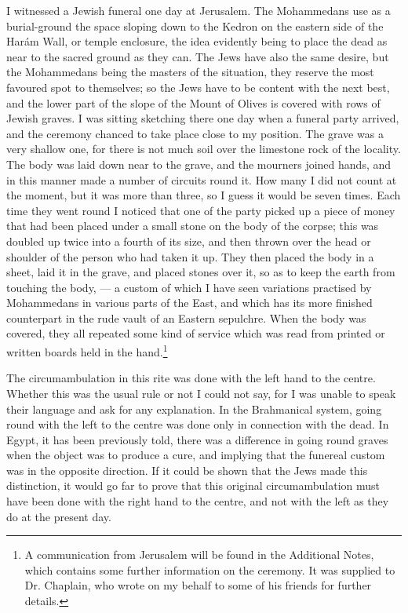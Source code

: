 \documentclass[a4paper, 11pt, oneside, polutonikogreek, english]{article}
\begin{document}
I witnessed a Jewish funeral one day at Jerusalem. The Mohammedans use as a burial-ground the space sloping down to the Kedron on the eastern side of the Harám Wall, or temple enclosure, the idea evidently being to place the dead as near to the sacred ground as they can. The Jews have also the same desire, but the Mohammedans being the masters of the situation, they reserve the most favoured spot to themselves; so the Jews have to be content with the next best, and the lower part of the slope of the Mount of Olives is covered with rows of Jewish graves. I was sitting sketching there one day when a funeral party arrived, and the ceremony chanced to take place close to my position. The grave was a very shallow one, for there is not much soil over the limestone rock of the locality. The body was laid down near to the grave, and the mourners joined hands, and in this manner made a number of circuits round it. How many I did not count at the moment, but it was more than three, so I guess it would be seven times. Each time they went round I noticed that one of the party picked up a piece of money that had been placed under a small stone on the body of the corpse; this was doubled up twice into a fourth of its size, and then thrown over the head or shoulder of the person who had taken it up. They then placed the body in a sheet, laid it in the grave, and placed stones over it, so as to keep the earth from touching the body, --- a custom of which I have seen variations practised by Mohammedans in various parts of the East, and which has its more finished counterpart in the rude vault of an Eastern sepulchre. When the body was covered, they all repeated some kind of service which was read from printed or written boards held in the hand.\footnote{A communication from Jerusalem will be found in the Additional Notes, which contains some further information on the ceremony. It was supplied to Dr. Chaplain, who wrote on my behalf to some of his friends for further details.}

The circumambulation in this rite was done with the left hand to the centre. Whether this was the usual rule or not I could not say, for I was unable to speak their language and ask for any explanation. In the Brahmanical system, going round with the left to the centre was done only in connection with the dead. In Egypt, it has been previously told, there was a difference in going round graves when the object was to produce a cure, and implying that the funereal custom was in the opposite direction. If it could be shown that the Jews made this distinction, it would go far to prove that this original circumambulation must have been done with the right hand to the centre, and not with the left as they do at the present day.
\end{document}

